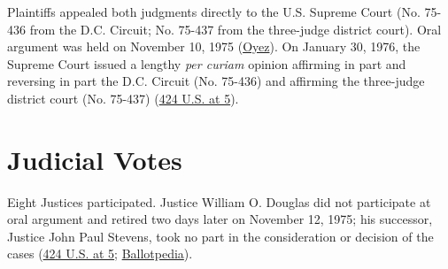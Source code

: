 \documentclass[12pt]{article}
\begin{document}
Plaintiffs appealed both judgments directly to the U.S. Supreme Court (No. 75-436 from the D.C. Circuit; No. 75-437 from the three-judge district court). Oral argument was held on November 10, 1975 (\href{https://www.oyez.org/cases/1975/75-436}{Oyez}). On January 30, 1976, the Supreme Court issued a lengthy \textit{per curiam} opinion affirming in part and reversing in part the D.C. Circuit (No. 75-436) and affirming the three-judge district court (No. 75-437) (\href{https://supreme.justia.com/cases/federal/us/424/1/}{424 U.S. at 5}).

\section{Judicial Votes}

Eight Justices participated. Justice William O. Douglas did not participate at oral argument and retired two days later on November 12, 1975; his successor, Justice John Paul Stevens, took no part in the consideration or decision of the cases (\href{https://supreme.justia.com/cases/federal/us/424/1/}{424 U.S. at 5}; \href{https://ballotpedia.org/Buckley_v._Valeo}{Ballotpedia}).
\end{document}

